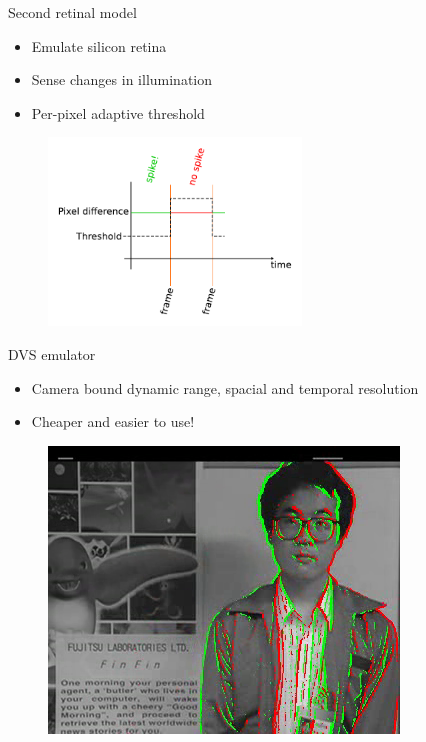 \documentclass[17pt,mathserif]{beamer}
\begin{document}
    \begin{frame}{Second retinal model}
      \vspace*{-2em}
      \begin{itemize}
        \item Emulate silicon retina
        \item Sense changes in illumination
        \item Per-pixel adaptive threshold
      \end{itemize}
      \vspace*{-1em}
      \begin{figure}
        \includegraphics[width=0.6\textwidth]{DVSemu}
      \end{figure}
    \end{frame}

    \begin{frame}{DVS emulator}
      \vspace*{-2em}
      \begin{itemize}
        \item Camera bound dynamic range, spacial and temporal resolution
        \item Cheaper and easier to use!
      \end{itemize}
      \vspace*{-1em}
      \begin{figure}
        \includegraphics[scale=0.4]{dvs-emu-img}
      \end{figure}
    \end{frame}
\end{document}
